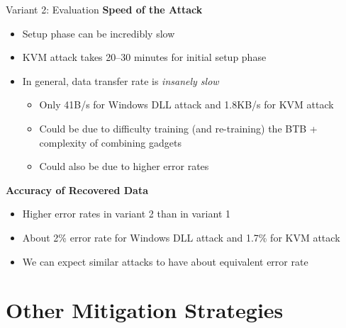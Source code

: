 \documentclass[10pt, dvipsnames, aspectratio=169]{beamer}
\begin{document}
\begin{frame}[c, fragile]{Variant 2: Evaluation}{}
  {\bf Speed of the Attack}
  \begin{itemize}
    \item Setup phase can be incredibly slow
    \item KVM attack takes 20--30 minutes for initial setup phase
    \item In general, data transfer rate is \textit{insanely slow}
    \begin{itemize}
      \item Only 41B/s for Windows DLL attack and 1.8KB/s for KVM attack
      \item Could be due to difficulty training (and re-training) the BTB + complexity of combining gadgets
      \item Could also be due to higher error rates
    \end{itemize}
  \end{itemize}

  \vfill
  {\bf Accuracy of Recovered Data}
  \begin{itemize}
    \item Higher error rates in variant 2 than in variant 1
    \item About 2\% error rate for Windows DLL attack and 1.7\% for KVM attack
    \item We can expect similar attacks to have about equivalent error rate
  \end{itemize}
\end{frame}

\section{Other Mitigation Strategies}
\end{document}
